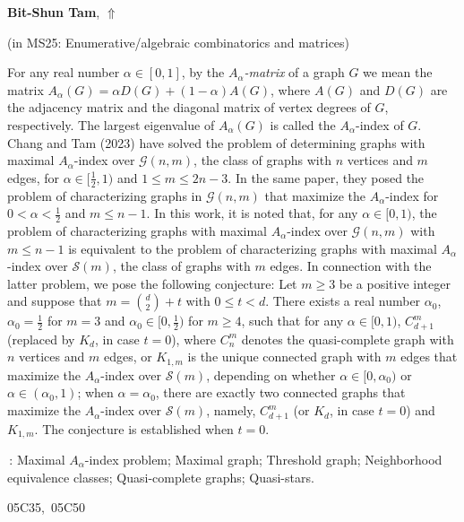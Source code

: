 \documentclass[ILAS2025-program.tex]{subfiles}
\begin{document}
\hypertarget{down0227}{}\begin{ilasabstract}
    
\textbf{Bit-Shun Tam},  \hfill \hyperlink{up0227}{$\Uparrow$}
    
    
(in {\color{mstitle}MS25: Enumerative/algebraic combinatorics and matrices})
        
\mtskip
    \noindent  For any real number $\alpha\in [0,1]$, by the {\it
$A_\alpha$-matrix} of a graph $G$ we mean the matrix
$A_{\alpha}(G)=\alpha D(G)+(1-\alpha)A(G)$, where $A(G)$ and $D(G)$
are the adjacency matrix and the diagonal matrix of vertex degrees
of $G$, respectively. The largest eigenvalue of $A_{\alpha}(G)$ is
called the $A_\alpha$-index of $G$. Chang and Tam (2023) have solved
the problem of determining graphs with maximal $A_{\alpha}$-index
over $\mathcal{G}(n,m)$, the class of graphs with $n$ vertices and
$m$ edges, for $\alpha \in [\frac{1}{2},1)$ and $1\le m\le 2n-3$. In
the same paper, they posed the problem of characterizing graphs in
$\mathcal{G}(n,m)$ that maximize the $A_{\alpha}$-index for $0<
\alpha < \frac{1}{2}$ and $m\le n-1$. In this work, it is noted
that, for any $\alpha\in [0,1)$, the problem of characterizing
graphs with maximal $A_{\alpha}$-index over $\mathcal{G}(n,m)$ with
$m\le n-1$ is equivalent to the problem of characterizing graphs
with maximal $A_{\alpha}$-index over $\mathscr{S}(m)$, the class of
graphs with $m$ edges. In connection with the latter problem, we
pose the following conjecture: Let $m\ge 3$ be a positive integer
and suppose that $m={\binom{d}{2}}+t$ with $0\le t < d$. There exists
a real number $\alpha_0$, $\alpha_0=\frac{1}{2}$ for $m=3$ and
$\alpha_0\in [0,\frac{1}{2})$ for $m\ge 4$, such that for any
$\alpha \in [0,1)$, $C^m_{d+1}$ (replaced by $K_d$, in case $t=0$),
where $C^m_n$ denotes the quasi-complete graph with $n$ vertices and
$m$ edges, or $K_{1,m}$ is the unique connected graph with $m$ edges
that maximize the $A_{\alpha}$-index over $\mathscr{S}(m)$,
depending on whether $\alpha\in [0,\alpha_0)$ or $\alpha\in
(\alpha_0,1)$; when $\alpha = \alpha_0$, there are exactly two
connected graphs that maximize the $A_{\alpha}$-index over
$\mathscr{S}(m)$, namely, $C^m_{d+1}$ (or $K_d$, in case $t=0$) and
$K_{1,m}$. The conjecture is established when $t=0$.

\vspace{2mm} \,: Maximal $A_{\alpha}$-index
problem; Maximal graph; Threshold graph; Neighborhood equivalence
classes; Quasi-complete graphs; Quasi-stars.
 \vspace{2mm}

 05C35,\ 05C50
\end{ilasabstract}
    
\end{document}
